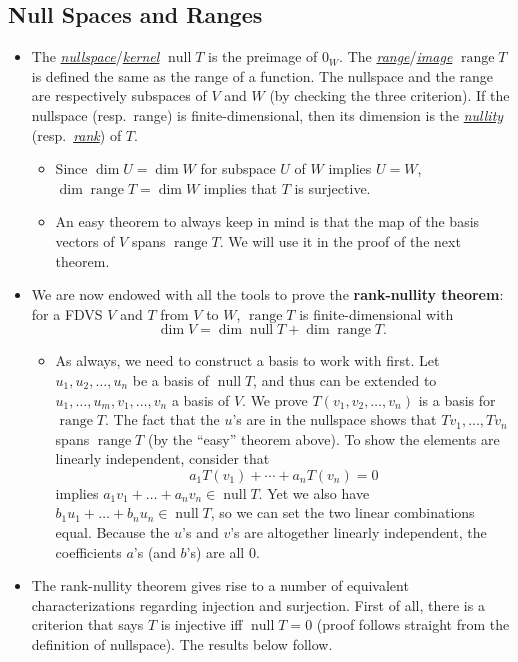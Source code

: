 \documentclass[11pt]{article}
\newcommand{\df}[1]{\ul{\textit{\textsf{#1}}}}
\newcommand{\n}{\operatorname{null}}
\renewcommand{\r}{\operatorname{range}}
\renewcommand{\d}{\dim}
\begin{document}
\subsection{Null Spaces and Ranges}
\begin{itemize}
    \item The \df{nullspace}/\df{kernel} $\n T$ is the preimage of $0_W$. The \df{range}/\df{image} $\r T$ is defined the same as the range of a function. The nullspace and the range are respectively subspaces of $V$ and $W$ (by checking the three criterion). If the nullspace (resp.\ range) is finite-dimensional, then its dimension is the \df{nullity} (resp.\ \df{rank}) of $T$.
    \begin{itemize}
        \item Since $\d U = \d W$ for subspace $U$ of $W$ implies $U = W$, $\d \r T = \d W$ implies that $T$ is surjective.
        \item An easy theorem to always keep in mind is that the map of the basis vectors of $V$ spans $\r T$. We will use it in the proof of the next theorem.
    \end{itemize}
    \item We are now endowed with all the tools to prove the \textbf{rank-nullity theorem}: for a FDVS $V$ and $T$ from $V$ to $W$, $\r T$ is finite-dimensional with $$\d V = \d \n T + \d \r T.$$
    \begin{itemize}
        \item As always, we need to construct a basis to work with first. Let $u_1, u_2, \dots, u_n$ be a basis of $\n T$, and thus can be extended to $u_1,\dots,u_m,v_1,\dots,v_n$ a basis of $V$. We prove $T(v_1, v_2, \dots, v_n)$ is a basis for $\r T$. The fact that the $u$'s are in the nullspace shows that $Tv_1, \dots,Tv_n$ spans $\r T$ (by the ``easy'' theorem above). To show the elements are linearly independent, consider that $$a_1 T(v_1)+\cdots+a_n T(v_n) = 0$$ implies $a_1v_1+\dots+a_nv_n \in \n T$. Yet we also have $b_1u_1+\dots+b_nu_n \in \n T$, so we can set the two linear combinations equal. Because the $u$'s and $v$'s are altogether linearly independent, the coefficients $a$'s (and $b$'s) are all 0.
    \end{itemize}
    \item The rank-nullity theorem gives rise to a number of equivalent characterizations regarding injection and surjection. First of all, there is a criterion that says $T$ is injective iff $\n T = {0}$ (proof follows straight from the definition of nullspace). The results below follow.

\end{itemize}
\end{document}
